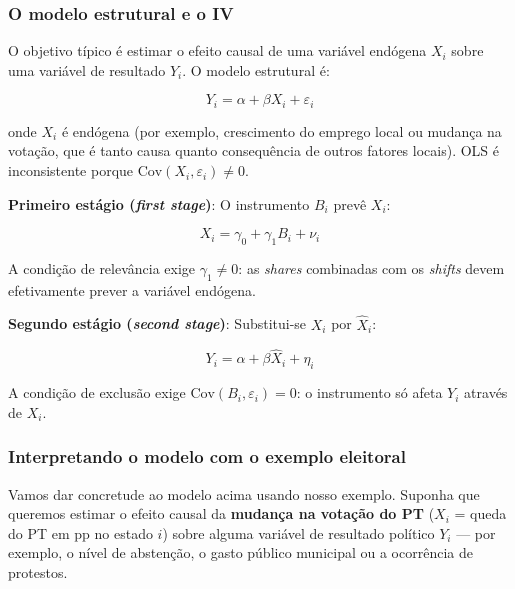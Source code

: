 \documentclass[
]{article}
\begin{document}
\subsubsection{O modelo estrutural e o IV}\label{o-modelo-estrutural-e-o-iv}

O objetivo típico é estimar o efeito causal de uma variável endógena \(X_i\) sobre uma variável de resultado \(Y_i\). O modelo estrutural é:

\begin{equation}
Y_i = \alpha + \beta X_i + \varepsilon_i
\label{eq:estrutural-shift-share}
\end{equation}

onde \(X_i\) é endógena (por exemplo, crescimento do emprego local ou mudança na votação, que é tanto causa quanto consequência de outros fatores locais). OLS é inconsistente porque \(\text{Cov}(X_i, \varepsilon_i) \neq 0\).

\textbf{Primeiro estágio (\emph{first stage})}: O instrumento \(B_i\) prevê \(X_i\):

\begin{equation}
X_i = \gamma_0 + \gamma_1 B_i + \nu_i
\label{eq:first-stage}
\end{equation}

A condição de relevância exige \(\gamma_1 \neq 0\): as \emph{shares} combinadas com os \emph{shifts} devem efetivamente prever a variável endógena.

\textbf{Segundo estágio (\emph{second stage})}: Substitui-se \(X_i\) por \(\hat{X}_i\):

\begin{equation}
Y_i = \alpha + \beta \hat{X}_i + \eta_i
\label{eq:second-stage}
\end{equation}

A condição de exclusão exige \(\text{Cov}(B_i, \varepsilon_i) = 0\): o instrumento só afeta \(Y_i\) através de \(X_i\).

\subsubsection{Interpretando o modelo com o exemplo eleitoral}\label{interpretando-o-modelo-com-o-exemplo-eleitoral}

Vamos dar concretude ao modelo acima usando nosso exemplo. Suponha que queremos estimar o efeito causal da \textbf{mudança na votação do PT} (\(X_i\) = queda do PT em pp no estado \(i\)) sobre alguma variável de resultado político \(Y_i\) --- por exemplo, o nível de abstenção, o gasto público municipal ou a ocorrência de protestos.
\end{document}
